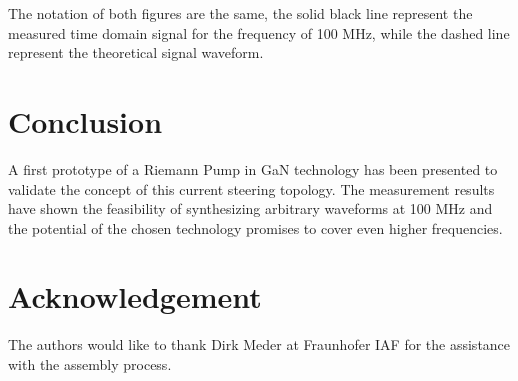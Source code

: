 \documentclass[journal]{IEEEtran}
\begin{document}
The notation of both figures are the same, the solid black line represent the measured time domain signal for the frequency of 100 MHz, while the dashed line represent the theoretical signal waveform.

\section{Conclusion}
\label{sec:conclusion}
A first prototype of a Riemann Pump in GaN technology has been presented to validate the concept of this current steering topology.
The measurement results have shown the feasibility of synthesizing arbitrary waveforms at 100 MHz and the potential of the chosen technology promises to cover even higher frequencies.


\section*{Acknowledgement}
The authors would like to thank Dirk Meder at Fraunhofer IAF for the assistance with the assembly process.




\nocite{*}
\end{document}
